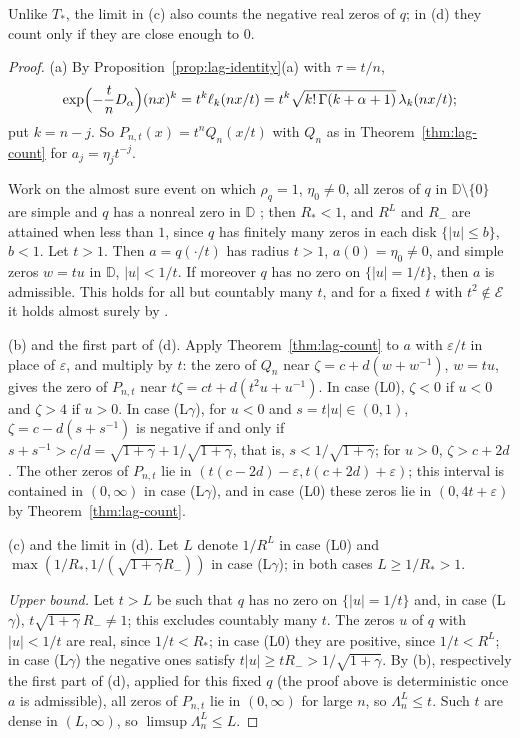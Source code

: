 \documentclass[11pt]{amsart}
\theoremstyle{definition}
\theoremstyle{remark}
\numberwithin{equation}{section}
\newcommand{\D}{\mathbb{D}}
\newcommand{\eps}{\varepsilon}
\begin{document}
Unlike $T_*$, the limit in (c) also counts the negative real zeros of $q$; in (d) they count only if they are close enough to $0$.

\begin{proof}
(a) By Proposition~\ref{prop:lag-identity}(a) with $\tau=t/n$,
\[
\exp\Bigl(-\frac tnD_\alpha\Bigr)(nx)^k=t^k\ell_k(nx/t)=t^k\sqrt{k!\,\Gamma(k+\alpha+1)}\,\lambda_k(nx/t);
\]
put $k=n-j$. So $P_{n,t}(x)=t^nQ_n(x/t)$ with $Q_n$ as in Theorem~\ref{thm:lag-count} for $a_j=\eta_jt^{-j}$.

Work on the almost sure event on which $\rho_q=1$, $\eta_0\ne0$, all zeros of $q$ in $\D\setminus\{0\}$ are simple \cite[Lemma~\ref{M-lem:resample}]{Main} and $q$ has a nonreal zero in $\D$ \cite[Proposition~\ref{M-prop:nonreal}]{Main}; then $R_*<1$, and $R^L$ and $R_-$ are attained when less than $1$, since $q$ has finitely many zeros in each disk $\{|u|\le b\}$, $b<1$. Let $t>1$. Then $a=q(\cdot/t)$ has radius $t>1$, $a(0)=\eta_0\ne0$, and simple zeros $w=tu$ in $\D$, $|u|<1/t$. If moreover $q$ has no zero on $\{|u|=1/t\}$, then $a$ is admissible. This holds for all but countably many $t$, and for a fixed $t$ with $t^2\notin\mathcal E$ it holds almost surely by \cite[Lemma~\ref{M-lem:circle}]{Main}.

(b) and the first part of (d). Apply Theorem~\ref{thm:lag-count} to $a$ with $\eps/t$ in place of $\eps$, and multiply by $t$: the zero of $Q_n$ near $\zeta=c+d(w+w^{-1})$, $w=tu$, gives the zero of $P_{n,t}$ near $t\zeta=ct+d(t^2u+u^{-1})$. In case (L0), $\zeta<0$ if $u<0$ and $\zeta>4$ if $u>0$. In case (L$\gamma$), for $u<0$ and $s=t|u|\in(0,1)$, $\zeta=c-d(s+s^{-1})$ is negative if and only if $s+s^{-1}>c/d=\sqrt{1+\gamma}+1/\sqrt{1+\gamma}$, that is, $s<1/\sqrt{1+\gamma}$; for $u>0$, $\zeta>c+2d$. The other zeros of $P_{n,t}$ lie in $(t(c-2d)-\eps,t(c+2d)+\eps)$; this interval is contained in $(0,\infty)$ in case (L$\gamma$), and in case (L0) these zeros lie in $(0,4t+\eps)$ by Theorem~\ref{thm:lag-count}.

(c) and the limit in (d). Let $L$ denote $1/R^L$ in case (L0) and $\max(1/R_*,1/(\sqrt{1+\gamma}R_-))$ in case (L$\gamma$); in both cases $L\ge1/R_*>1$.

\emph{Upper bound.} Let $t>L$ be such that $q$ has no zero on $\{|u|=1/t\}$ and, in case (L$\gamma$), $t\sqrt{1+\gamma}\,R_-\ne1$; this excludes countably many $t$. The zeros $u$ of $q$ with $|u|<1/t$ are real, since $1/t<R_*$; in case (L0) they are positive, since $1/t<R^L$; in case (L$\gamma$) the negative ones satisfy $t|u|\ge tR_->1/\sqrt{1+\gamma}$. By (b), respectively the first part of (d), applied for this fixed $q$ (the proof above is deterministic once $a$ is admissible), all zeros of $P_{n,t}$ lie in $(0,\infty)$ for large $n$, so $\Lambda^L_n\le t$. Such $t$ are dense in $(L,\infty)$, so $\limsup\Lambda^L_n\le L$.


\end{proof}
\end{document}
